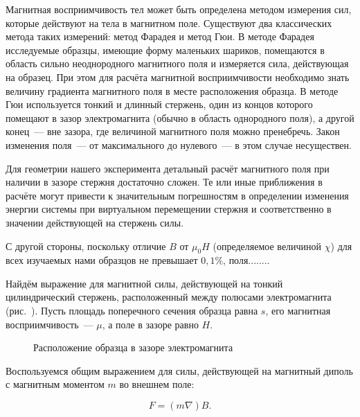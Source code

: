 
Магнитная восприимчивость тел может быть определена методом измерения сил, которые действуют на тела в магнитном поле. Существуют два классических метода таких измерений: метод Фарадея и метод Гюи. В методе Фарадея исследуемые образцы, имеющие форму маленьких шариков, помещаются в область сильно неоднородного магнитного поля и измеряется сила, действующая на образец. При этом для расчёта магнитной восприимчивости необходимо знать величину градиента магнитного поля в месте расположения образца. В методе Гюи используется тонкий и длинный стержень, один из концов которого помещают в зазор электромагнита (обычно в область однородного поля), а другой конец~--- вне зазора, где величиной магнитного поля можно пренебречь. Закон изменения поля~--- от максимального до нулевого~--- в этом случае несуществен.

Для геометрии нашего эксперимента детальный расчёт магнитного поля при наличии в зазоре стержня достаточно сложен. Те или иные приближения в расчёте могут привести к значительным погрешностям в определении изменения энергии системы при виртуальном перемещении стержня и соответственно в значении действующей на стержень силы.

С другой стороны, поскольку отличие $B$ от $\mu_0 H$ (определяемое величиной $\chi$) для всех изучаемых нами образцов не превышает $0,1\%$, поля........


Найдём выражение для магнитной силы, действующей на тонкий цилиндрический стержень, расположенный между полюсами электромагнита (рис.~). Пусть площадь поперечного сечения образца равна $s$, его магнитная восприимчивость~--- $\mu$, а поле в зазоре равно $H$.

\begin{wrapfigure}[13]{r}{0.4\textwidth}
	\caption{Расположение образца в зазоре электромагнита}
\end{wrapfigure}

Воспользуемся общим выражением для силы, действующей на магнитный диполь с магнитным моментом $m$ во внешнем поле:

\begin{equation*}
	F = (m\nabla)B.
\end{equation*}


